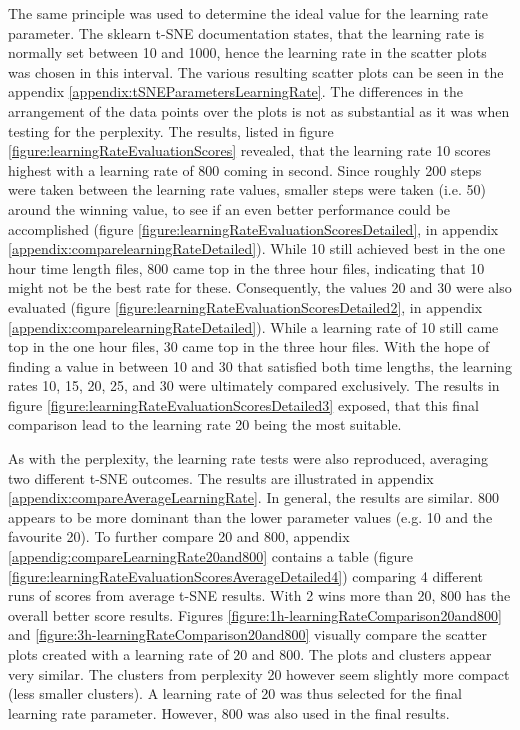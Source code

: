 The same principle was used to determine the ideal value for the learning rate parameter. The sklearn t-SNE documentation states, that the learning rate is normally set between 10 and 1000, hence the learning rate in the scatter plots was chosen in this interval.
The various resulting scatter plots can be seen in the appendix \ref{appendix:tSNEParametersLearningRate}. The differences in the arrangement of the data points over the plots is not as substantial as it was when testing for the perplexity. The results, listed in figure \ref{figure:learningRateEvaluationScores} revealed, that the learning rate 10 scores highest with a learning rate of 800 coming in second. Since roughly 200 steps were taken between the learning rate values, smaller steps were taken (i.e. 50) around the winning value, to see if an even better performance could be accomplished (figure \ref{figure:learningRateEvaluationScoresDetailed}, in appendix \ref{appendix:comparelearningRateDetailed}). While 10 still achieved best in the one hour time length files, 800 came top in the three hour files, indicating that 10 might not be the best rate for these. Consequently, the values 20 and 30 were also evaluated (figure \ref{figure:learningRateEvaluationScoresDetailed2}, in appendix \ref{appendix:comparelearningRateDetailed}). While a learning rate of 10 still came top in the one hour files, 30 came top in the three hour files. With the hope of finding a value in between 10 and 30 that satisfied both time lengths, the learning rates 10, 15, 20, 25, and 30 were ultimately compared exclusively. The results in figure \ref{figure:learningRateEvaluationScoresDetailed3} exposed, that this final comparison lead to the learning rate 20 being the most suitable. 

As with the perplexity, the learning rate tests were also reproduced, averaging two different t-SNE outcomes. The results are illustrated in appendix \ref{appendix:compareAverageLearningRate}. In general, the results are similar. 800 appears to be more dominant than the lower parameter values (e.g. 10 and the favourite 20). To further compare 20 and 800, appendix \ref{appendig:compareLearningRate20and800} contains a table (figure \ref{figure:learningRateEvaluationScoresAverageDetailed4}) comparing 4 different runs of scores from average t-SNE results. With 2 wins more than 20, 800 has the overall better score results. Figures \ref{figure:1h-learningRateComparison20and800} and \ref{figure:3h-learningRateComparison20and800} visually compare the scatter plots created with a learning rate of 20 and 800. The plots and clusters appear very similar. The clusters from perplexity 20 however seem slightly more compact (less smaller clusters). A learning rate of 20 was thus selected for the final learning rate parameter. However, 800 was also used in the final results.


